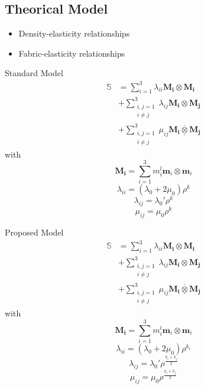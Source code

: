 \documentclass[a4paper,fleqn]{DC_ArtStyle}
\begin{document}
	\subsection{Theorical Model}
	\begin{itemize}
		\item Density-elasticity relationships
		\item Fabric-elasticity relationships
	\end{itemize}

	Standard Model
	\begin{equation}
		\begin{split}
		\mathbb{S} &= \sum_{i=1}^{3} \lambda_{ii} \mathbf{M_i} \otimes \mathbf{M_i}\\
				   &+ \sum_{\substack{i,j=1\\i\neq j}}^{3} \lambda_{ij} \mathbf{M_i} \otimes \mathbf{M_j}\\
				   &+ \sum_{\substack{i,j=1\\i\neq j}}^{3} \mu_{ij} \mathbf{M_i} \underline{\overline{\otimes}}  \mathbf{M_j}
		\end{split}
	\end{equation}
	with
	\begin{equation}
		\mathbf{M_i} = \sum_{i=1}^{3} m_i^l \mathbf{m}_i \otimes \mathbf{m}_i
	\end{equation}
	\begin{equation}
		\lambda_{ii} = (\lambda_0 + 2\mu_0) \rho^k
	\end{equation}
	\begin{equation}
		\lambda_{ij} = \lambda_0' \rho^k
	\end{equation}
	\begin{equation}
		\mu_{ij} = \mu_0 \rho^k
	\end{equation}


	Proposed Model
	\begin{equation}
		\begin{split}
		\mathbb{S} &= \sum_{i=1}^{3} \lambda_{ii} \mathbf{M_i} \otimes \mathbf{M_i}\\
					&+ \sum_{\substack{i,j=1\\i\neq j}}^{3} \lambda_{ij} \mathbf{M_i} \otimes \mathbf{M_j}\\
					&+ \sum_{\substack{i,j=1\\i\neq j}}^{3} \mu_{ij} \mathbf{M_i} \underline{\overline{\otimes}}  \mathbf{M_j}
		\end{split}
	\end{equation}
	with
	\begin{equation}
		\mathbf{M_i} = \sum_{i=1}^{3} m_i^l \mathbf{m}_i \otimes \mathbf{m}_i
	\end{equation}
	\begin{equation}
		\lambda_{ii} = (\lambda_0 + 2\mu_0) \rho^{k_i}
	\end{equation}
	\begin{equation}
		\lambda_{ij} = \lambda_0' \rho^{\frac{k_i+k_j}{2}}
	\end{equation}
	\begin{equation}
		\mu_{ij} = \mu_0 \rho^{\frac{k_i+k_j}{2}}
	\end{equation}
	
\end{document}
